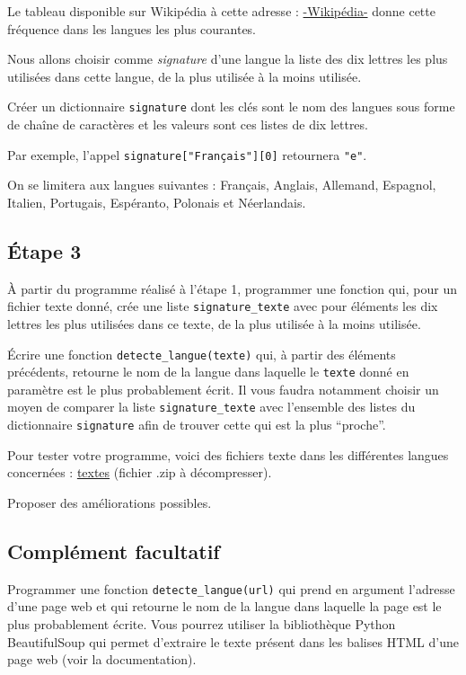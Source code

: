 \documentclass[
  letterpaper,
  DIV=11,
  numbers=noendperiod]{scrartcl}
\begin{document}
Le tableau disponible sur Wikipédia à cette adresse :
\href{https://fr.wikipedia.org/wiki/Fr\%C3\%A9quence_d\%27apparition_des_lettres\#Dans_d\textquotesingle{}autres_langues}{-Wikipédia-}
donne cette fréquence dans les langues les plus courantes.

Nous allons choisir comme \emph{signature} d'une langue la liste des dix
lettres les plus utilisées dans cette langue, de la plus utilisée à la
moins utilisée.

Créer un dictionnaire \texttt{signature} dont les clés sont le nom des
langues sous forme de chaîne de caractères et les valeurs sont ces
listes de dix lettres.

Par exemple, l'appel \texttt{signature{[}"Français"{]}{[}0{]}}
retournera \texttt{"e"}.

On se limitera aux langues suivantes : Français, Anglais, Allemand,
Espagnol, Italien, Portugais, Espéranto, Polonais et Néerlandais.

\hypertarget{uxe9tape-3}{%
\subsection{Étape 3}\label{uxe9tape-3}}

À partir du programme réalisé à l'étape 1, programmer une fonction qui,
pour un fichier texte donné, crée une liste \texttt{signature\_texte}
avec pour éléments les dix lettres les plus utilisées dans ce texte, de
la plus utilisée à la moins utilisée.

Écrire une fonction \texttt{detecte\_langue(texte)} qui, à partir des
éléments précédents, retourne le nom de la langue dans laquelle le
\texttt{texte} donné en paramètre est le plus probablement écrit. Il
vous faudra notamment choisir un moyen de comparer la liste
\texttt{signature\_texte} avec l'ensemble des listes du dictionnaire
\texttt{signature} afin de trouver cette qui est la plus ``proche''.

Pour tester votre programme, voici des fichiers texte dans les
différentes langues concernées : \href{textes.zip}{textes} (fichier .zip
à décompresser).

Proposer des améliorations possibles.

\hypertarget{compluxe9ment-facultatif}{%
\subsection{Complément facultatif}\label{compluxe9ment-facultatif}}

Programmer une fonction \texttt{detecte\_langue(url)} qui prend en
argument l'adresse d'une page web et qui retourne le nom de la langue
dans laquelle la page est le plus probablement écrite. Vous pourrez
utiliser la bibliothèque Python BeautifulSoup qui permet d'extraire le
texte présent dans les balises HTML d'une page web (voir la
documentation).
\end{document}
